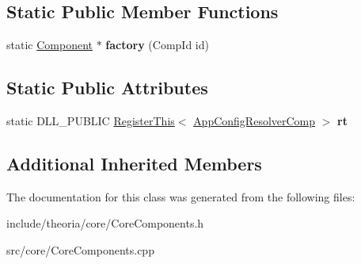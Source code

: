 \subsection*{Static Public Member Functions}
\begin{DoxyCompactItemize}
\item 
\mbox{\label{classtheoria_1_1core_1_1AppConfigResolverComp_aa439f83c466b28a3d1df82cc106f87b4}} 
static \hyperlink{classtheoria_1_1core_1_1Component}{Component} $\ast$ {\bfseries factory} (Comp\+Id id)
\end{DoxyCompactItemize}
\subsection*{Static Public Attributes}
\begin{DoxyCompactItemize}
\item 
\mbox{\label{classtheoria_1_1core_1_1AppConfigResolverComp_a25d3ff11e2e50221cd2755fbc8feb313}} 
static D\+L\+L\+\_\+\+P\+U\+B\+L\+IC \hyperlink{classtheoria_1_1core_1_1RegisterThis}{Register\+This}$<$ \hyperlink{classtheoria_1_1core_1_1AppConfigResolverComp}{App\+Config\+Resolver\+Comp} $>$ {\bfseries rt}
\end{DoxyCompactItemize}
\subsection*{Additional Inherited Members}


The documentation for this class was generated from the following files\+:\begin{DoxyCompactItemize}
\item 
include/theoria/core/Core\+Components.\+h\item 
src/core/Core\+Components.\+cpp\end{DoxyCompactItemize}
